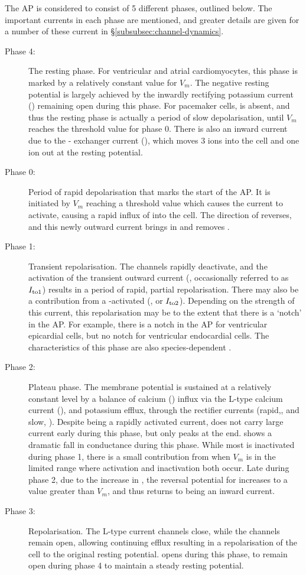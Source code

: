 \documentclass[../thesis-main.tex]{subfiles}
\begin{document}
 The AP is considered to consist of 5 different phases, outlined below. The important currents in each phase are mentioned, and greater details are given for a number of these current in \S\ref{subsubsec:channel-dynamics}.
 \begin{description}
  \item[Phase 4:] The resting phase. For ventricular and atrial cardiomyocytes, this phase is marked by a relatively constant value for $V_m$. The negative resting potential is largely achieved by the inwardly rectifying potassium current (\ikix{}) remaining open during this phase. For pacemaker cells, \ikix{} is absent, and thus the resting phase is actually a period of slow depolarisation, until $V_m$ reaches the threshold value for phase 0. There is also an inward current due to the \na{}-\ca{} exchanger current (\inaca), which moves 3 \na{} ions into the cell and one \ca{} ion out at the resting potential.
  \item[Phase 0:] Period of rapid depolarisation that marks the start of the AP. It is initiated by $V_m$ reaching a threshold value which causes the \ina{} current to activate, causing a rapid influx of \na{} into the cell. The direction of \inaca{} reverses, and this newly outward current brings in \ca{} and removes \na{}.
  \item[Phase 1:] Transient repolarisation. The \na{} channels rapidly deactivate, and the activation of the transient \K{} outward current (\ito{}, occasionally referred to as $I_{\textnormal{to1}}$) results in a period of rapid, partial repolarisation. There may also be a contribution from a \ca{}-activated \cl (\icacl, or $I_{\textnormal{to2}}$). Depending on the strength of this current, this repolarisation may be to the extent that there is a `notch' in the AP. For example, there is a notch in the AP for ventricular epicardial cells, but no notch for ventricular endocardial cells. The characteristics of this phase are also species-dependent \citep{Carmeliet2006}.
  \item[Phase 2:] Plateau phase. The membrane potential is sustained at a relatively constant level by a balance of calcium (\ca{}) influx via the L-type calcium current (\ica{}), and potassium efflux, through the rectifier \K{} currents (rapid,\ikr{}, and slow, \iks{}). Despite being a rapidly activated current, \ikr{} does not carry large current early during this phase, but only peaks at the end. \ikix{} shows a dramatic fall in conductance during this phase. While most \ina{} is inactivated during phase 1, there is a small contribution from \ina{} when $V_m$ is in the limited range where activation and inactivation both occur. Late during phase 2, due to the increase in \cai{}, the reversal potential for \inaca{} increases to a value greater than $V_m$, and thus \inaca{} returns to being an inward current.
  \item[Phase 3:] Repolarisation. The L-type \ca{} current channels close, while the \iks{} channels remain open, allowing continuing \K{} efflux resulting in a repolarisation of the cell to the original resting potential. \ikix{} opens during this phase, to remain open during phase 4 to maintain a steady resting potential. 
 \end{description}
\end{document}
